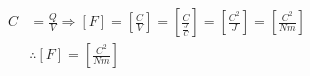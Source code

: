 \begin{align*}
    C &= \frac{Q}{V} \Rightarrow [F] = \left[\frac{C}{V}\right] = \left[ \frac{C}{\frac{J}{C}} \right] = \left[ \frac{C^2}{J} \right] = \left[ \frac{C^2}{Nm} \right] \\
    &\therefore [F] = \left[ \frac{C^2}{Nm} \right]
\end{align*}
